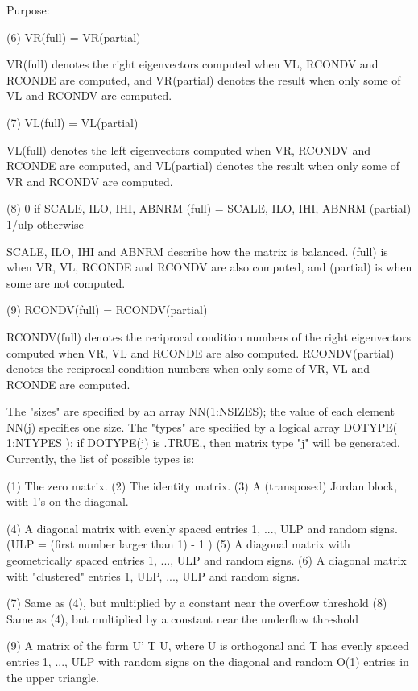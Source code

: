 \begin{DoxyParagraph}{Purpose\+: }
\begin{DoxyVerb}
    (6)     VR(full) = VR(partial)

      VR(full) denotes the right eigenvectors computed when VL, RCONDV
      and RCONDE are computed, and VR(partial) denotes the result
      when only some of VL and RCONDV are computed.

    (7)     VL(full) = VL(partial)

      VL(full) denotes the left eigenvectors computed when VR, RCONDV
      and RCONDE are computed, and VL(partial) denotes the result
      when only some of VR and RCONDV are computed.

    (8)     0 if SCALE, ILO, IHI, ABNRM (full) =
                 SCALE, ILO, IHI, ABNRM (partial)
            1/ulp otherwise

      SCALE, ILO, IHI and ABNRM describe how the matrix is balanced.
      (full) is when VR, VL, RCONDE and RCONDV are also computed, and
      (partial) is when some are not computed.

    (9)     RCONDV(full) = RCONDV(partial)

      RCONDV(full) denotes the reciprocal condition numbers of the
      right eigenvectors computed when VR, VL and RCONDE are also
      computed. RCONDV(partial) denotes the reciprocal condition
      numbers when only some of VR, VL and RCONDE are computed.

    The "sizes" are specified by an array NN(1:NSIZES); the value of
    each element NN(j) specifies one size.
    The "types" are specified by a logical array DOTYPE( 1:NTYPES );
    if DOTYPE(j) is .TRUE., then matrix type "j" will be generated.
    Currently, the list of possible types is:

    (1)  The zero matrix.
    (2)  The identity matrix.
    (3)  A (transposed) Jordan block, with 1's on the diagonal.

    (4)  A diagonal matrix with evenly spaced entries
         1, ..., ULP  and random signs.
         (ULP = (first number larger than 1) - 1 )
    (5)  A diagonal matrix with geometrically spaced entries
         1, ..., ULP  and random signs.
    (6)  A diagonal matrix with "clustered" entries 1, ULP, ..., ULP
         and random signs.

    (7)  Same as (4), but multiplied by a constant near
         the overflow threshold
    (8)  Same as (4), but multiplied by a constant near
         the underflow threshold

    (9)  A matrix of the form  U' T U, where U is orthogonal and
         T has evenly spaced entries 1, ..., ULP with random signs
         on the diagonal and random O(1) entries in the upper
         triangle.


\end{DoxyVerb}
\end{DoxyParagraph}
